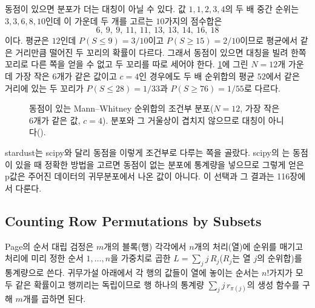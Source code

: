 동점이 있으면 분포가 더는 대칭이 아닐 수 있다. 값 $1,1,2,3,4$의 두 배 중간 순위는 $3,3,6,8,10$인데 이 가운데 두 개를 고르는 $10$가지의 점수합은
\[
6,\ 9,\ 9,\ 11,\ 11,\ 13,\ 13,\ 14,\ 16,\ 18
\]
이다. 평균은 $12$인데 $P(S\le9)=3/10$이고 $P(S\ge15)=2/10$이므로 평균에서 같은 거리만큼 떨어진 두 꼬리의 확률이 다르다. 그래서 동점이 있으면 대칭을 빌려 한쪽 꼬리로 다른 쪽을 얻을 수 없고 두 꼬리를 따로 세어야 한다. \cref{fig:ties-dist}에 그린 $N=12$개 가운데 가장 작은 $6$개가 같은 값이고 $c=4$인 경우에도 두 배 순위합의 평균 $52$에서 같은 거리에 있는 두 꼬리가 $P(S\le28)=1/33$과 $P(S\ge76)=1/55$로 다르다.

\begin{figure}[htbp]
\centering
{}
\caption{동점이 있는 Mann--Whitney 순위합의 조건부 분포($N=12$, 가장 작은 $6$개가 같은 값, $c=4$). 분포와 그 거울상이 겹치지 않으므로 대칭이 아니다().}
\label{fig:ties-dist}
\end{figure} stardust는 scipy와 달리 동점을 이렇게 조건부로 다루는 쪽을 골랐다. scipy의 는 동점이 있을 때 정확한 방법을 고르면 동점이 없는 분포에 통계량을 넣으므로 그렇게 얻은 p값은 주어진 데이터의 귀무분포에서 나온 값이 아니다. 이 선택과 그 결과는 116장에서 다룬다.

\subsection{Counting Row Permutations by Subsets}

Page의 순서 대립 검정\cite{page1963}은 $m$개의 블록(행) 각각에서 $n$개의 처리(열)에 순위를 매기고 처리에 미리 정한 순서 $1,\dots,n$을 가중치로 곱한 $L=\sum_jj\,R_j$($R_j$는 열 $j$의 순위합)를 통계량으로 쓴다. 귀무가설 아래에서 각 행의 값들이 열에 놓이는 순서는 $n!$가지가 모두 같은 확률이고 행끼리는 독립이므로 행 하나의 통계량 $\sum_jj\,r_{\pi(j)}$의 생성 함수를 구해 $m$개를 곱하면 된다.

